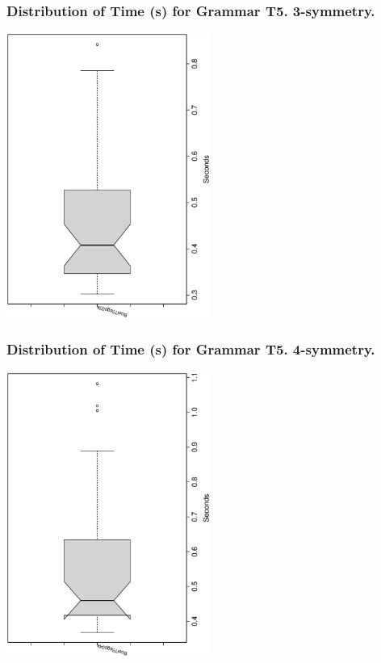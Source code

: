 \documentclass[18pt,c]{beamer}
\begin{document}
 \begin{frame}
 \frametitle{ Distribution of Time (s) for Grammar T5. 3-symmetry. }
 \begin{center}
\includegraphics[width=0.5\textwidth, angle=-90]
{ExpFboxplottSeconds001.eps}
 \end{center}
 \label{ExpFboxplottSeconds001.eps}  
 \end{frame}

 \begin{frame}
 \frametitle{ Distribution of Time (s) for Grammar T5. 4-symmetry. }
 \begin{center}
\includegraphics[width=0.5\textwidth, angle=-90]
{ExpFboxplottSeconds002.eps}
 \end{center}
 \label{ExpFboxplottSeconds002.eps}  
 \end{frame}
\end{document}
